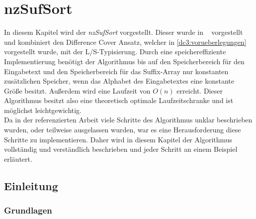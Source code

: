 \section{nzSufSort}
\label{algorithm:nzSufSort}

In  diesem Kapitel wird der \emph{nzSufSort} vorgestellt. Dieser wurde in ~\cite{saca:10} vorgestellt und kombiniert den Difference Cover Ansatz, welcher in \cref{dc3:vorueberlegungen} vorgestellt wurde, mit der L/S-Typisierung. Durch eine speichereffiziente Implementierung benötigt der Algorithmus bis auf den Speicherbereich für den Eingabetext und den Speicherbereich für das Suffix-Array nur konstanten zusätzlichen Speicher, wenn das Alphabet des Eingabetextes eine konstante Größe besitzt. Außerdem wird eine Laufzeit von $O(n)$ erreicht. Dieser Algorithmus besitzt also eine theoretisch optimale Laufzeitschranke und ist möglichst leichtgewichtig. \\
Da in der referenzierten Arbeit viele Schritte des Algorithmus unklar beschrieben wurden, oder teilweise ausgelassen wurden, war es eine Herausforderung diese Schritte zu implementieren. Daher wird in diesem Kapitel der Algorithmus vollständig und verständlich beschrieben und jeder Schritt an einem Beispiel erläutert. \\

\subsection{Einleitung}

\subsubsection{Grundlagen}

